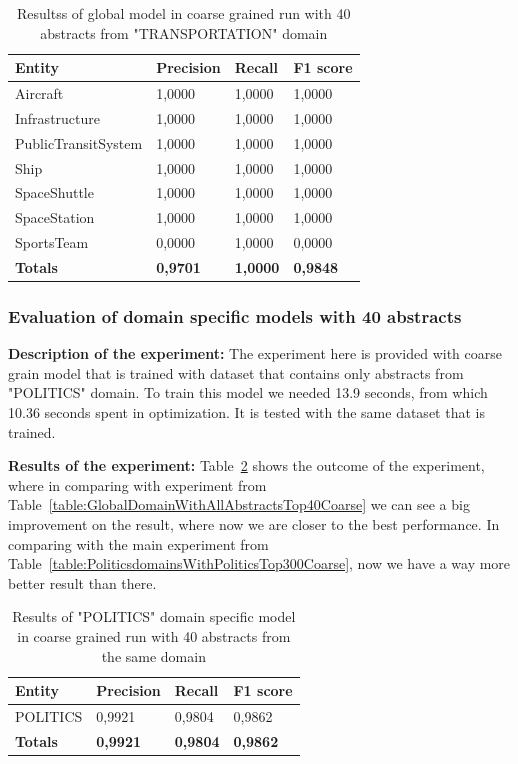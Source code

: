 \documentclass[thesis=M,english]{FITthesis}[2018/05/30]
\begin{document}
	\begin{table}[H]\centering
		\begin{tabular}{|l|l|l|l|}
			\hline {\textbf{Entity}} & {\textbf{Precision}} & {\textbf{Recall}} & {\textbf{F1 score}}\\\hline
				Aircraft & 1,0000 & 1,0000 & 1,0000\\
				Infrastructure & 1,0000 & 1,0000 & 1,0000\\
				PublicTransitSystem & 1,0000 & 1,0000 & 1,0000\\
				Ship & 1,0000 & 1,0000 & 1,0000\\				
				SpaceShuttle & 1,0000 & 1,0000 & 1,0000\\
				SpaceStation & 1,0000 & 1,0000 & 1,0000\\
				SportsTeam & 0,0000 & 1,0000 & 0,0000\\\hline
				\textbf{Totals} & \textbf{0,9701} & \textbf{1,0000} & \textbf{0,9848}\\\hline
		\end{tabular}
		\caption{Resultss of global model in coarse grained run with 40 abstracts from "TRANSPORTATION" domain \label{table:GlobalDomainWithTransportationTop40Fine}}
	\end{table}	
	
	
\subsubsection{Evaluation of domain specific models with 40 abstracts}

	\textbf{Description of the experiment:} The experiment here is provided with coarse grain model that is trained with dataset that contains only abstracts from "POLITICS" domain. To train this model we needed 13.9 seconds, from which 10.36 seconds spent in optimization. It is tested with the same dataset that is trained.

	\textbf{Results of the experiment:} Table~\ref{table:PoliticsDomainWithPoliticsTop40Coarse} shows the outcome of the experiment, where in comparing with experiment from Table~\ref{table:GlobalDomainWithAllAbstractsTop40Coarse} we can see a big improvement on the result, where now we are closer to the best performance. In comparing with the main experiment from Table~\ref{table:PoliticsdomainsWithPoliticsTop300Coarse}, now we have a way more better result than there.

	\begin{table}[H]\centering
		\begin{tabular}{|l|l|l|l|}
			\hline {\textbf{Entity}} & {\textbf{Precision}} & {\textbf{Recall}} & {\textbf{F1 score}}\\\hline
				POLITICS & 0,9921 & 0,9804 & 0,9862\\\hline
				\textbf{Totals} & \textbf{0,9921} & \textbf{0,9804} & \textbf{0,9862}\\\hline
		\end{tabular}
		\caption{Results of "POLITICS" domain specific model in coarse grained run with 40 abstracts from the same domain \label{table:PoliticsDomainWithPoliticsTop40Coarse}}	
	\end{table}
\end{document}
